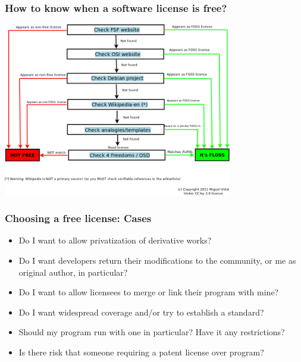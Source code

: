 \begin{frame}
\frametitle{How to know when a software license is free?}

\begin{center}
\includegraphics[width=10cm]{figs/flowchart-licenses.png}
\end{center}

\end{frame}



\begin{frame}
\frametitle{Choosing a free license: Cases}

\begin{itemize}
\item Do I want to allow privatization of derivative works?
\pause
\item Do I want developers return their modifications to the community, or me as original author, in particular?
\pause
\item Do I want to allow licensees to merge or link their program with mine?
\pause
\item Do I want widespread coverage and/or try to establish a standard?
\pause
\item Should my program run with one in particular? Have it any restrictions?
\pause
\item Is there risk that someone requiring a patent license over program?
\end{itemize}


\end{frame}


